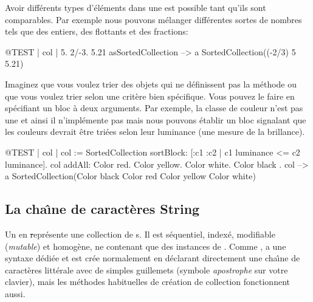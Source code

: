 \documentclass[a4paper,10pt,twoside]{book}
\begin{document}
Avoir diff\'erents types d'\'el\'ements dans une  est
possible tant qu'ils sont comparables.
Par exemple nous pouvons m\'elanger diff\'erentes sortes de nombres tels
que des entiers, des flottants et des fractions:
\begin{code}{@TEST | col |}
{ 5. 2/-3. 5.21 } asSortedCollection --> a SortedCollection((-2/3) 5 5.21)
\end{code}

Imaginez que vous voulez trier des objets qui ne d\'efinissent pas
la m\'ethode \ct{<=} ou que vous voulez trier selon une crit\`ere bien sp\'ecifique.
Vous pouvez le faire en sp\'ecifiant un bloc \`a deux arguments.
Par exemple, la classe de couleur  n'est pas une  et
ainsi il n'impl\'emente pas \ct{<=} mais nous pouvons \'etablir un bloc
signalant que les couleurs devrait \^etre tri\'ees selon leur
luminance (une mesure de la brillance).

\begin{code}{@TEST | col |}
col := SortedCollection sortBlock: [:c1 :c2 | c1 luminance <= c2 luminance].
col addAll: { Color red. Color yellow. Color white. Color black }.
col --> a SortedCollection(Color black Color red Color yellow Color white)
\end{code}

\subsection{La cha\^{\i}ne de caract\`eres String}
Un  en \st repr\'esente une collection de s.
Il est s\'equentiel, index\'e, modifiable (\emph{mutable}) et homog\`ene, ne
contenant que des instances de .
Comme ,  a une syntaxe d\'edi\'ee et est cr\'ee normalement
en d\'eclarant directement une cha\^{\i}ne de caract\`eres litt\'erale avec
de simples guillemets 
(symbole \emph{apostrophe} sur votre clavier),
mais les m\'ethodes habituelles de cr\'eation de collection fonctionnent aussi.

\end{document}

